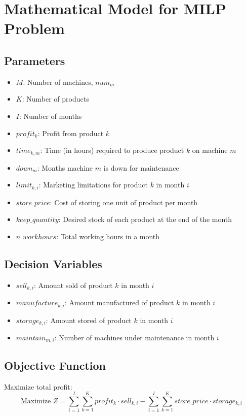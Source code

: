 \documentclass{article}
\begin{document}
\section*{Mathematical Model for MILP Problem}

\subsection*{Parameters}
\begin{itemize}
    \item $M$: Number of machines, $num_m$
    \item $K$: Number of products
    \item $I$: Number of months
    \item $profit_k$: Profit from product $k$
    \item $time_{k,m}$: Time (in hours) required to produce product $k$ on machine $m$
    \item $down_m$: Months machine $m$ is down for maintenance
    \item $limit_{k,i}$: Marketing limitations for product $k$ in month $i$
    \item $store\_price$: Cost of storing one unit of product per month
    \item $keep\_quantity$: Desired stock of each product at the end of the month
    \item $n\_workhours$: Total working hours in a month
\end{itemize}

\subsection*{Decision Variables}
\begin{itemize}
    \item $sell_{k,i}$: Amount sold of product $k$ in month $i$
    \item $manufacture_{k,i}$: Amount manufactured of product $k$ in month $i$
    \item $storage_{k,i}$: Amount stored of product $k$ in month $i$
    \item $maintain_{m,i}$: Number of machines under maintenance in month $i$
\end{itemize}

\subsection*{Objective Function}
Maximize total profit:
\[
\text{Maximize } Z = \sum_{i=1}^{I} \sum_{k=1}^{K} profit_k \cdot sell_{k,i} - \sum_{i=1}^{I} \sum_{k=1}^{K} store\_price \cdot storage_{k,i}
\]
\end{document}

